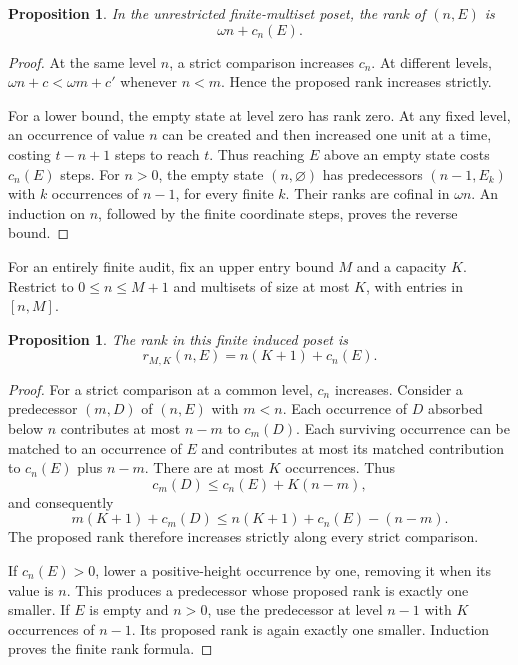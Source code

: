 \documentclass[11pt,letterpaper]{article}
\newtheorem{proposition}[theorem]{Proposition}
\theoremstyle{definition}
\theoremstyle{remark}
\begin{document}
\begin{proposition}\label{prop:unbounded-model}
In the unrestricted finite-multiset poset, the rank of $(n,E)$ is
\[
 \omega n+c_n(E).
\]
\end{proposition}
\begin{proof}
At the same level $n$, a strict comparison increases $c_n$. At different levels, $\omega n+c<\omega m+c'$ whenever $n<m$. Hence the proposed rank increases strictly.

For a lower bound, the empty state at level zero has rank zero. At any fixed level, an occurrence of value $n$ can be created and then increased one unit at a time, costing $t-n+1$ steps to reach $t$. Thus reaching $E$ above an empty state costs $c_n(E)$ steps. For $n>0$, the empty state $(n,\varnothing)$ has predecessors $(n-1,E_k)$ with $k$ occurrences of $n-1$, for every finite $k$. Their ranks are cofinal in $\omega n$. An induction on $n$, followed by the finite coordinate steps, proves the reverse bound.
\end{proof}

For an entirely finite audit, fix an upper entry bound $M$ and a capacity $K$. Restrict to $0\le n\le M+1$ and multisets of size at most $K$, with entries in $[n,M]$.

\begin{proposition}\label{prop:finite-model}
The rank in this finite induced poset is
\[
 r_{M,K}(n,E)=n(K+1)+c_n(E).
\]
\end{proposition}
\begin{proof}
For a strict comparison at a common level, $c_n$ increases. Consider a predecessor $(m,D)$ of $(n,E)$ with $m<n$. Each occurrence of $D$ absorbed below $n$ contributes at most $n-m$ to $c_m(D)$. Each surviving occurrence can be matched to an occurrence of $E$ and contributes at most its matched contribution to $c_n(E)$ plus $n-m$. There are at most $K$ occurrences. Thus
\[
 c_m(D)\le c_n(E)+K(n-m),
\]
and consequently
\[
 m(K+1)+c_m(D)\le n(K+1)+c_n(E)-(n-m).
\]
The proposed rank therefore increases strictly along every strict comparison.

If $c_n(E)>0$, lower a positive-height occurrence by one, removing it when its value is $n$. This produces a predecessor whose proposed rank is exactly one smaller. If $E$ is empty and $n>0$, use the predecessor at level $n-1$ with $K$ occurrences of $n-1$. Its proposed rank is again exactly one smaller. Induction proves the finite rank formula.
\end{proof}
\end{document}
